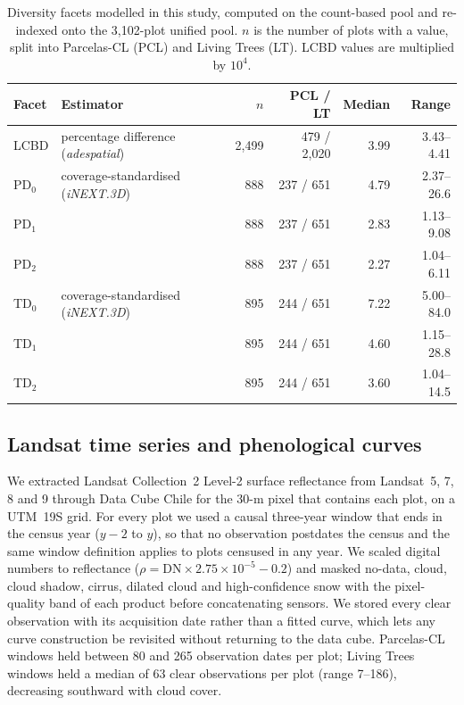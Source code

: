 \documentclass[preprint,12pt]{elsarticle}
\begin{document}
\begin{table}[t]
\centering
\footnotesize
\caption{Diversity facets modelled in this study, computed on the count-based pool and
re-indexed onto the 3,102-plot unified pool. $n$ is the number of plots with a value, split
into Parcelas-CL (PCL) and Living Trees (LT). LCBD values are multiplied by $10^{4}$.}
\label{tab:facets}
\begin{tabular}{llrrrr}
\toprule
Facet & Estimator & $n$ & PCL / LT & Median & Range \\
\midrule
LCBD & percentage difference (\emph{adespatial}) & 2,499 & 479 / 2,020 & 3.99 & 3.43--4.41 \\
PD$_0$ & coverage-standardised (\emph{iNEXT.3D}) & 888 & 237 / 651 & 4.79 & 2.37--26.6 \\
PD$_1$ & & 888 & 237 / 651 & 2.83 & 1.13--9.08 \\
PD$_2$ & & 888 & 237 / 651 & 2.27 & 1.04--6.11 \\
TD$_0$ & coverage-standardised (\emph{iNEXT.3D}) & 895 & 244 / 651 & 7.22 & 5.00--84.0 \\
TD$_1$ & & 895 & 244 / 651 & 4.60 & 1.15--28.8 \\
TD$_2$ & & 895 & 244 / 651 & 3.60 & 1.04--14.5 \\
\bottomrule
\end{tabular}
\end{table}

\subsection{Landsat time series and phenological curves}
\label{sec:curves}

We extracted Landsat Collection~2 Level-2 surface reflectance \citep{crawford2023landsat}
from Landsat~5, 7, 8 and 9 through Data Cube Chile
\citep{datacubechile,killough2018odc} for the 30-m pixel that contains each plot, on a
UTM~19S grid. For every plot we used a causal three-year
window that ends in the census year ($y-2$ to $y$), so that no observation postdates the
census and the same window definition applies to plots censused in any year. We scaled
digital numbers to reflectance ($\rho = \mathrm{DN} \times 2.75 \times 10^{-5} - 0.2$) and
masked no-data, cloud, cloud shadow, cirrus, dilated cloud and high-confidence snow with
the pixel-quality band of each product before concatenating sensors. We stored every
clear observation with its acquisition date rather than a fitted curve, which lets any
curve construction be revisited without returning to the data cube. Parcelas-CL windows
held between 80 and 265 observation dates per plot; Living Trees windows held a median of
63 clear observations per plot (range 7--186), decreasing southward with cloud cover.
\end{document}
